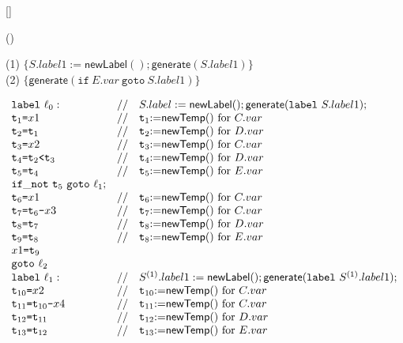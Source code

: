 \documentclass[dvipdfmx,a4j]{jarticle}
\newcounter{coffee}
\newcounter{bean}
\newcommand{\tteq}{\texttt{=}}
\newcommand{\ttlt}{\texttt{<}}
\newcommand{\ttsb}{\texttt{-}}
\newcommand{\tmpv}[1]{\texttt{t}_{#1}}
\begin{document}
\begin{list}{[]}{}
\item 
\begin{list}{()}{}
\item (1) $\{S.label1:=\mathsf{\mathsf{newLabel}}(); \mathsf{generate}(S.label1)\}$\\
(2) $\{\mathsf{generate}(\texttt{if}\ E.var\ \texttt{goto}\ S.label1)\}$
\item \[\begin{array}{lll}
  {\tt label}\ \ell_0: & // & S.label:=\mathsf{newLabel}(); \mathsf{generate}({\tt label}\ S.label1);\\
\tmpv{1} \tteq x1 & // & \tmpv{1}{\rm :=}\mathsf{newTemp}()\ \mbox{for $C.var$}\\
\tmpv{2} \tteq \tmpv{1} & // &  \tmpv{2}{\rm :=}\mathsf{newTemp}()\ \mbox{for $D.var$}\\
\tmpv{3} \tteq x2 & // & \tmpv{3}{\rm :=}\mathsf{newTemp}()\ \mbox{for $C.var$}\\
\tmpv{4} \tteq \tmpv{2}\ttlt\tmpv{3} & // & \tmpv{4}{\rm :=}\mathsf{newTemp}()\ \mbox{for $D.var$}\\
\tmpv{5} \tteq \tmpv{4} & // & \tmpv{5}{\rm :=}\mathsf{newTemp}()\ \mbox{for $E.var$}\\
{\tt if\_not}\ \tmpv{5}\ \texttt{goto}\ \ell_1;\\
\tmpv{6} \tteq x1 & // & \tmpv{6}{\rm :=}\mathsf{newTemp}()\ \mbox{for $C.var$}\\
\tmpv{7} \tteq \tmpv{6}\ttsb x3 & // & \tmpv{7}{\rm :=}\mathsf{newTemp}()\ \mbox{for $C.var$}\\
\tmpv{8} \tteq \tmpv{7} & // & \tmpv{8}{\rm :=}\mathsf{newTemp}()\ \mbox{for $D.var$}\\
\tmpv{9} \tteq \tmpv{8} & // & \tmpv{8}{\rm :=}\mathsf{newTemp}()\ \mbox{for $E.var$}\\
x1 \tteq \tmpv{9}\\
{\tt goto}\ \ell_2\\
{\tt label}\ \ell_1: & // & S^{(1)}.label1:=\mathsf{newLabel}(); \mathsf{generate}({\tt label}\ S^{(1)}.label1);\\
\tmpv{10} \tteq x2 & // & \tmpv{10}{\rm :=}\mathsf{newTemp}()\ \mbox{for $C.var$}\\
\tmpv{11} \tteq \tmpv{10}\ttsb x4 & // & \tmpv{11}{\rm :=}\mathsf{newTemp}()\ \mbox{for $C.var$}\\
\tmpv{12} \tteq \tmpv{11} & // & \tmpv{12}{\rm :=}\mathsf{newTemp}()\ \mbox{for $D.var$}\\
\tmpv{13} \tteq \tmpv{12} & // & \tmpv{13}{\rm :=}\mathsf{newTemp}()\ \mbox{for $E.var$}\\

\end{array}\]
\end{list}
\end{list}
\end{document}
